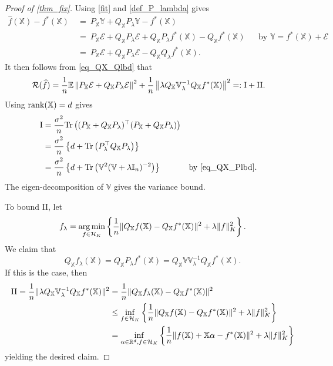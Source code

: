 \documentclass[11pt,twoside]{article}
\DeclareMathOperator*{\argmin}{arg\,min}
\def\VV{\mathbb{V}}
\def\II{\mathbb{I}}
\def\YY{\mathbb{Y}}
\def\XX{\mathbb{X}}
\def\RR{\mathbb{R}}
\def\EE{\mathbb{E}}
\def\cH{\mathcal H}
\def\cE{\mathcal E}
\def\cR{\mathcal R}
\def\rI{\mathrm{I}}
\def\rII{\mathrm{II}}
\def\wh{\widehat}
\def\T{\top}
\def\tr{{\rm Tr}}
\def\l{\left}
\def\r{\right}
\newcommand{\rank}{\ensuremath{{\rm rank}}}
\begin{document}
\medskip

\begin{proof}[Proof of \cref{thm_fix}]
Using \eqref{fit} and \eqref{def_P_lambda} gives 
\begin{align} \label{eq_decom_f_hat} \nonumber
        \wh f(\XX) - f^*  (\XX )     
 & ~ =~      P_{\XX}\YY  + Q_{\XX}P_{\lambda} \YY - f^*  (\XX)\\  \nonumber
& ~ =~     P_ \XX  \cE  +  Q_{\XX}P_{\lambda}  \cE +   Q_{\XX} P_{\lambda}  f^*(\XX) - Q_{\XX}f^*(\XX) &&\text{by $\YY = f^*(\XX) + \cE$ }\\
&~ = ~ P_ \XX  \cE  +  Q_{\XX}P_{\lambda} \cE -  Q_{\XX} Q_{\lambda} f^*(\XX).
\end{align} 
It then follows from \eqref{eq_QX_Qlbd} that 
\begin{align}\label{eq_decom_1}
 \cR(\wh f) &= {1\over n} \EE\left\|
  P_ \XX  \cE     +  Q_{\XX} P_\lambda  \cE 
 \right\|^2 + {1\over n} \left\|
\lambda Q_{\XX}  \VV_\lambda^{-1} Q_{\XX} f^*(\XX)
 \right\|^2 =: \rI + \rII.  
\end{align} 
Using  $\rank(\XX) = d$ gives 
\begin{align*}
    \rI  &=    {\sigma^2 \over n}  \tr\l( 
  (P_ \XX     +  Q_{\XX} P_\lambda)^\T  (P_ \XX     +  Q_{\XX} P_\lambda)\r)\\ & =   {\sigma^2  \over n} \left\{ d +    \tr\l(P_\lambda^\T Q_{\XX}  P_\lambda\r)\right\}\\
  &=  {\sigma^2  \over n} \left\{ d +   \tr\l(\VV^2(\VV+\lambda \II_n)^{-2}\r)\right\} &&\text{by \eqref{eq_QX_Plbd}}.
\end{align*}  
The eigen-decomposition of $\VV$ gives the variance bound.

To bound $\rII$,  let
    \begin{equation}\label{def_f_lambda}
        f_\lambda =  \argmin_{f\in \cH_K}\l\{
            {1\over n}\|Q_{\XX}  f(\XX) - Q_{\XX}  f^*(\XX)  \|^2 + \lambda \|f\|_K^2
        \r\}.
    \end{equation}
    We claim that  
  \begin{equation}\label{target_Qf}
        Q_{\XX} f_\lambda(\XX) = Q_{\XX}  P_\lambda  f^*(\XX)  =  Q_{\XX} \VV\VV_\lambda^{-1}  Q_{\XX} f^*(\XX).
    \end{equation}
    If this is the case, then  
    \begin{align*}
 \rII=        {1\over n}\| \lambda Q_{\XX}  \VV_{\lambda}^{-1} Q_{\XX} f^*  (\XX)\|^2  &=  {1\over n}\|Q_{\XX} f_\lambda(\XX) - Q_{\XX}  f^*(\XX)\|^2 \\
        &\le   \inf_{f\in \cH_K}\l\{
            {1\over n}\|Q_{\XX} f(\XX) - Q_{\XX}  f^*(\XX)\|^2 + \lambda \|f\|_K^2
        \r\}\\ 
        &= \inf_{\alpha\in \RR^d, f\in \cH_K}\l\{
            {1\over n}\| f(\XX) +\XX\alpha -  f^*(\XX) \|^2 + \lambda \|f\|_K^2
        \r\}
    \end{align*} 
    yielding the desired claim. 
    

\end{proof}
\end{document}
